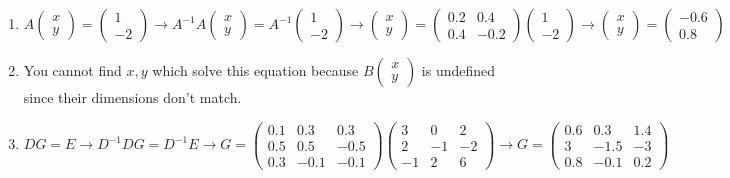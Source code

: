 \documentclass{article}
\begin{document}
\begin{enumerate}
\begin{enumerate}
\item 
$
A \left(\begin{array}{c} x \\ y \end{array} \right) = \left(\begin{array}{c} 1 \\ -2 \end{array} \right)
\rightarrow
A^{-1} A \left(\begin{array}{c} x \\ y \end{array} \right) = A^{-1} \left(\begin{array}{c} 1 \\ -2 \end{array} \right)
\rightarrow
\left(\begin{array}{c} x \\ y \end{array} \right) = \left(\begin{array}{cc} 0.2 & 0.4 \\ 0.4 & -0.2 \end{array} \right) \left(\begin{array}{c} 1 \\ -2 \end{array} \right)
\rightarrow
\left(\begin{array}{c} x \\ y \end{array} \right) =  \left(\begin{array}{c} -0.6 \\ 0.8 \end{array} \right)
$

\item You cannot find $x,y$ which solve this equation because $B \left(\begin{array}{c}x\\y \end{array}\right)$ is undefined since their dimensions don't match.

\item
$
DG = E
\rightarrow
D^{-1}DG = D^{-1}E
\rightarrow
G = \left(\begin{array}{ccc} 0.1 & 0.3 & 0.3 \\ 0.5 & 0.5 & -0.5 \\ 0.3 & -0.1 & -0.1 \end{array} \right)  
       \left(\begin{array}{ccc} 3 & 0 & 2 \\ 2 & -1 & -2 \\ -1 & 2 & 6 \end{array} \right)
\rightarrow
G = \left(\begin{array}{ccc} 0.6 & 0.3 & 1.4 \\ 3 & -1.5 & -3 \\ 0.8 & -0.1 & 0.2 \end{array} \right)  
$
\end{enumerate}


\end{enumerate}
\end{document}
